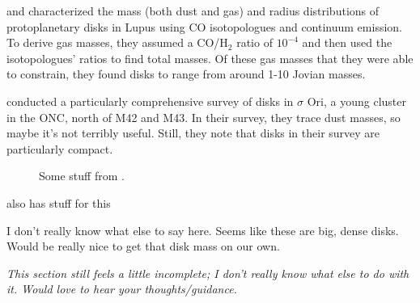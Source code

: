 \citet{Ansdell2016} and \citet{Ansdell2018} characterized the mass (both dust and gas) and radius distributions of protoplanetary disks in Lupus using CO isotopologues and continuum emission. To derive gas masses, they assumed a CO/H$_2$ ratio of $10^{-4}$ and then used the isotopologues' ratios to find total masses. Of these gas masses that they were able to constrain, they found disks to range from around 1-10 Jovian masses.


\citet{Eisner2018} conducted a particularly comprehensive survey of disks in $\sigma$ Ori, a young cluster in the ONC, north of M42 and M43. In their survey, they trace dust masses, so maybe it's not terribly useful. Still, they note that disks in their survey are particularly compact.
\begin{figure}[htp]
  \centering
    \hspace*{\fill}%
    \hspace*{\fill}%
    \caption{Some stuff from \citet{Eisner2018}.}
    \label{fig:bf_disk_strs}
\end{figure}

\citep{Cieza2019} also has stuff for this

I don't really know what else to say here. Seems like these are big, dense disks. Would be really nice to get that disk mass on our own.







\textit{This section still feels a little incomplete; I don't really know what else to do with it. Would love to hear your thoughts/guidance.}






